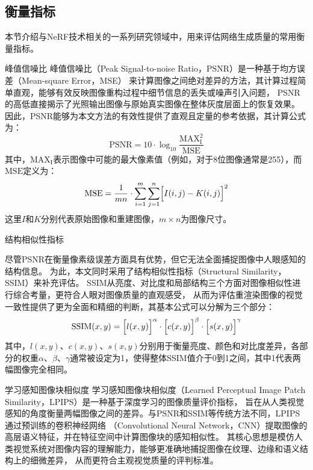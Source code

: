 \subsection{衡量指标}

本节介绍与NeRF技术相关的一系列研究领域中，用来评估网络生成质量的常用衡量指标。

 峰值信噪比
峰值信噪比（Peak Signal-to-noise Ratio，PSNR）是一种基于均方误差（Mean-square Error，MSE）
来计算图像之间绝对差异的方法，其计算过程简单直观，能够有效反映图像重构过程中细节信息的丢失或噪声引入问题，
PSNR的高低直接揭示了光照输出图像与原始真实图像在整体灰度层面上的恢复效果。
因此，PSNR能够为本文方法的有效性提供了直观且定量的参考依据，其计算公式为：
\begin{equation}\label{eq:PSNR}
\mathrm{PSNR}=10\cdot\log_{10}\frac{\mathrm{MAX}_\mathrm{I}^2}{\mathrm{MSE}}
\end{equation}
其中，$\mathrm{MAX}_\mathrm{I}$表示图像中可能的最大像素值（例如，对于8位图像通常是255），而$\mathrm{MSE}$定义为：
\begin{equation}\label{eq:MSE}
\mathrm{MSE}=\frac{1}{mn}\cdot\sum_{i=1}^{m}\sum_{j=1}^{n}\Bigl[I(i,j)-K(i,j)\Bigr]^2
\end{equation}
这里$I$和$K$分别代表原始图像和重建图像，$m\times n$为图像尺寸。

 结构相似性指标

尽管PSNR在衡量像素级误差方面具有优势，但它无法全面捕捉图像中人眼感知的结构信息。
为此，本文同时采用了结构相似性指标（Structural Similarity，SSIM）来补充评估。
SSIM从亮度、对比度和局部结构三个方面对图像相似性进行综合考量，更符合人眼对图像质量的直观感受，
从而为评估重渲染图像的视觉一致性提供了更为全面和精细的判断，其基本公式可以分解为三个部分：
\begin{equation}\label{eq:SSIM}
\mathrm{SSIM}(x,y)=\Bigl[l(x,y)\Bigr]^\alpha\cdot\Bigl[c(x,y)\Bigr]^\beta\cdot\Bigl[s(x,y)\Bigr]^\gamma
\end{equation}
其中，$l(x,y)$、$c(x,y)$、$s(x,y)$分别用于衡量亮度、颜色和对比度差异，各部分的权重$\alpha$、$\beta$、$\gamma$通常被设定为1，使得整体SSIM值介于0到1之间，其中1代表两幅图像完全相同。

 学习感知图像块相似度
学习感知图像块相似度（Learned Perceptual Image Patch Similarity，LPIPS）是一种基于深度学习的图像质量评价指标，
旨在从人类视觉感知的角度衡量两幅图像之间的差异。与PSNR和SSIM等传统方法不同，LPIPS通过预训练的卷积神经网络
（Convolutional Neural Network，CNN）提取图像的高层语义特征，并在特征空间中计算图像块的感知相似性。
其核心思想是模仿人类视觉系统对图像内容的理解能力，能够更准确地捕捉图像在纹理、边缘和语义结构上的细微差异，
从而更符合主观视觉质量的评判标准。

